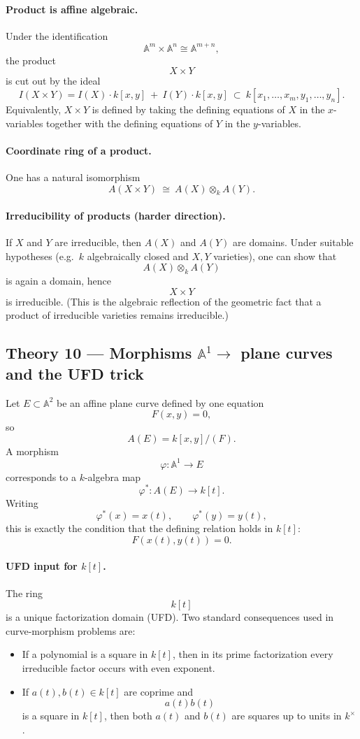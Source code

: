 \documentclass[12pt,a4paper]{article}
\theoremstyle{plain}
\theoremstyle{definition}      %
\begin{document}
\paragraph{Product is affine algebraic.}
Under the identification
\[
\mathbb{A}^m\times \mathbb{A}^n \cong \mathbb{A}^{m+n},
\]
the product
\[
X\times Y
\]
is cut out by the ideal
\[
I(X\times Y)
=
I(X)\cdot k[x,y]\ +\ I(Y)\cdot k[x,y]
\ \subset\
k[x_1,\dots,x_m,y_1,\dots,y_n].
\]
Equivalently, $X\times Y$ is defined by taking the defining equations of $X$ in the $x$-variables together with the defining equations of $Y$ in the $y$-variables.

\paragraph{Coordinate ring of a product.}
One has a natural isomorphism
\[
A(X\times Y)
\ \cong\
A(X)\otimes_k A(Y).
\]

\paragraph{Irreducibility of products (harder direction).}
If $X$ and $Y$ are irreducible, then $A(X)$ and $A(Y)$ are domains.
Under suitable hypotheses (e.g.\ $k$ algebraically closed and $X,Y$ varieties), one can show that
\[
A(X)\otimes_k A(Y)
\]
is again a domain, hence
\[
X\times Y
\]
is irreducible.
(This is the algebraic reflection of the geometric fact that a product of irreducible varieties remains irreducible.)


\subsection*{Theory 10 — Morphisms $\mathbb{A}^1 \to$ plane curves and the UFD trick}

Let $E\subset \mathbb{A}^2$ be an affine plane curve defined by one equation
\[
F(x,y)=0,
\]
so
\[
A(E)=k[x,y]/(F).
\]
A morphism
\[
\varphi:\mathbb{A}^1\to E
\]
corresponds to a $k$-algebra map
\[
\varphi^* : A(E) \to k[t].
\]
Writing
\[
\varphi^*(x)=x(t),
\qquad
\varphi^*(y)=y(t),
\]
this is exactly the condition that the defining relation holds in $k[t]$:
\[
F(x(t),y(t))=0.
\]

\paragraph{UFD input for $k[t]$.}
The ring
\[
k[t]
\]
is a unique factorization domain (UFD).
Two standard consequences used in curve-morphism problems are:
\begin{itemize}
	\item If a polynomial is a square in $k[t]$, then in its prime factorization every irreducible factor occurs with even exponent.
	\item If $a(t),b(t)\in k[t]$ are coprime and
	\[
	a(t)b(t)
	\]
	is a square in $k[t]$, then both $a(t)$ and $b(t)$ are squares up to units in $k^\times$.
\end{itemize}
\end{document}
